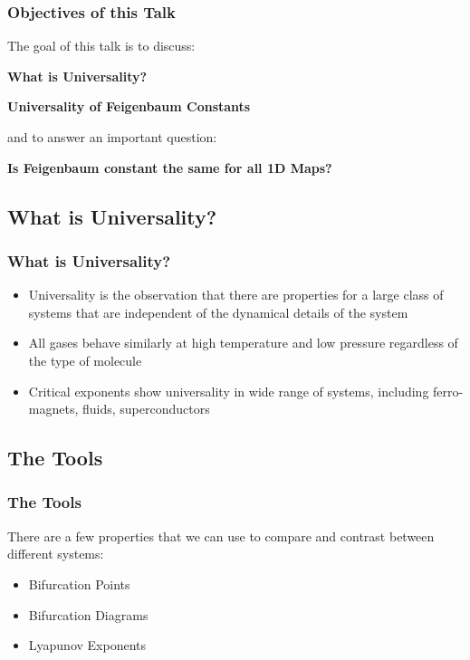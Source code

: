 \documentclass[
	11pt, %
	aspectratio=169, %
]{beamer}
\begin{document}
\begin{frame}
    \frametitle{Objectives of this Talk}
The goal of this talk is to discuss:
    \begin{center}
        \item \textbf{\large{What is Universality?}}
        \item \textbf{\large{Universality of Feigenbaum Constants}} 
    \end{center}
    \vspace{7mm}
and to answer an important question:
    \begin{center}
        \item \textbf{\large{Is Feigenbaum constant the same for all 1D Maps?}}
    \end{center}
\end{frame}

\subsection{What is Universality?}

\begin{frame}
	\frametitle{What is Universality?}
	
	\begin{itemize}
        \item Universality is the observation that there are properties for a large class of systems that are independent of the dynamical details of the system \pause
        \item All gases behave similarly at high temperature and low pressure regardless of the type of molecule \pause
        \item Critical exponents show universality in wide range of systems, including ferro-magnets, fluids, superconductors
    \end{itemize}

\end{frame}


\subsection{The Tools}

\begin{frame}
	\frametitle{The Tools}
	There are a few properties that we can use to compare and contrast between different systems: \pause
    \begin{itemize}
        \item Bifurcation Points \pause
        \item Bifurcation Diagrams \pause
        \item Lyapunov Exponents
    \end{itemize}

\end{frame}
\end{document}

